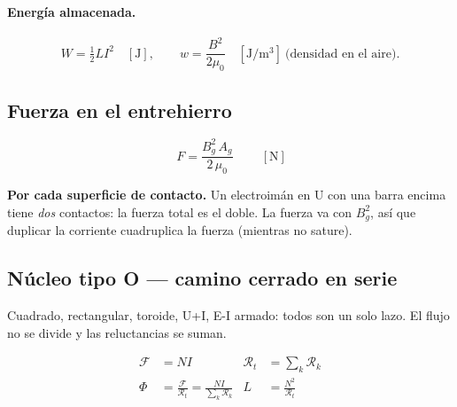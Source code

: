 \documentclass[11pt,a4paper]{article}
\newcommand{\muz}{\mu_0}
\newcommand{\Rel}{\mathcal{R}}          %
\newcommand{\fmm}{\mathcal{F}}          %
\begin{document}
\paragraph{Energía almacenada.}
\begin{equation}
  W = \tfrac{1}{2} L I^2 \quad [\unit{\joule}],
  \qquad
  w = \frac{B^2}{2\muz} \quad [\unit{\joule\per\metre\cubed}] \ \text{(densidad en el aire)} .
\end{equation}

\subsection{Fuerza en el entrehierro}

\begin{equation}
  \boxed{\ F = \frac{B_g^2\,A_g}{2\,\muz} \ } \qquad [\unit{\newton}]
\end{equation}

\noindent \textbf{Por cada superficie de contacto.} Un electroimán en U con una barra
encima tiene \emph{dos} contactos: la fuerza total es el doble. La fuerza va con $B_g^2$,
así que duplicar la corriente cuadruplica la fuerza (mientras no sature).

\subsection{Núcleo tipo O — camino cerrado en serie}

\begin{center}
\end{center}

Cuadrado, rectangular, toroide, U+I, E-I armado: todos son un solo lazo. El flujo no se
divide y las reluctancias se suman.

\begin{align}
  \fmm &= N I  & \Rel_t &= \sum_k \Rel_k \\
  \Phi &= \frac{\fmm}{\Rel_t} = \frac{NI}{\sum_k \Rel_k}
       & L &= \frac{N^2}{\Rel_t}
\end{align}
\end{document}
